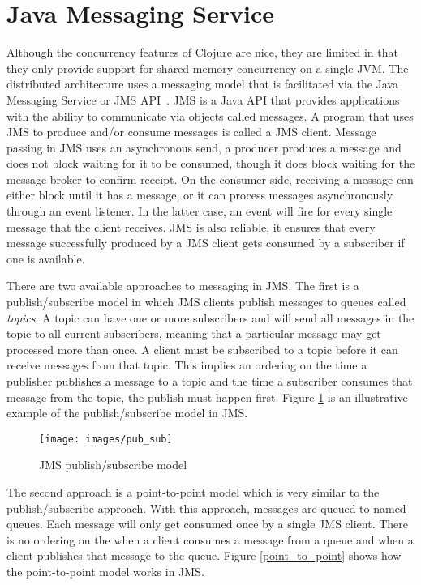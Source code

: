 \section{Java Messaging Service}
Although the concurrency features of Clojure are nice, they are limited in that they only provide support for shared memory concurrency on a single JVM. 
The distributed architecture uses a messaging model that is facilitated via the Java Messaging Service or JMS API~\cite{jms}.
JMS is a Java API that provides applications with the ability to communicate via objects called messages.
A program that uses JMS to produce and/or consume messages is called a JMS client.
Message passing in JMS uses an asynchronous send, a producer produces a message and does not block waiting for it to be consumed, though it does block waiting for the message broker to confirm receipt.
On the consumer side, receiving a message can either block until it has a message, or it can process messages asynchronously through an event listener.
In the latter case, an event will fire for every single message that the client receives.
JMS is also reliable, it ensures that every message successfully produced by a JMS client gets consumed by a subscriber if one is available.

There are two available approaches to messaging in JMS.
The first is a publish/subscribe model in which JMS clients publish messages to queues called {\it topics}.
A topic can have one or more subscribers and will send all messages in the topic to all current subscribers, meaning that a particular message may get processed more than once.
A client must be subscribed to a topic before it can receive messages from that topic.
This implies an ordering on the time a publisher publishes a message to a topic and the time a subscriber consumes that message from the topic, the publish must happen first.
Figure \ref{pub_sub} is an illustrative example of the publish/subscribe model in JMS.

\begin{figure}[h!]
  \centering
  \texttt{[image: images/pub\_sub]}
  \caption{JMS publish/subscribe model}
  \label{pub_sub}
\end{figure}

The second approach is a point-to-point model which is very similar to the publish/subscribe approach.
With this approach, messages are queued to named queues.
Each message will only get consumed once by a single JMS client.
There is no ordering on the when a client consumes a message from a queue and when a client publishes that message to the queue.
Figure \ref{point_to_point} shows how the point-to-point model works in JMS.

